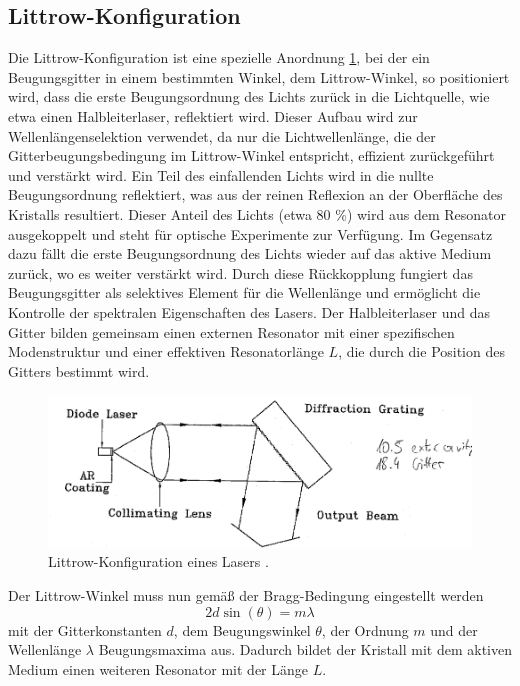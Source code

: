 \subsection{Littrow-Konfiguration}
Die Littrow-Konfiguration ist eine spezielle Anordnung \ref{fig:Littrow}, bei der ein Beugungsgitter in einem bestimmten Winkel, 
dem Littrow-Winkel, so positioniert wird, dass die erste Beugungsordnung des Lichts zurück in die Lichtquelle, wie etwa einen Halbleiterlaser, 
reflektiert wird. 
Dieser Aufbau wird zur Wellenlängenselektion verwendet, da nur die Lichtwellenlänge, die der Gitterbeugungsbedingung im Littrow-Winkel entspricht, 
effizient zurückgeführt und verstärkt wird.
Ein Teil des einfallenden Lichts wird in die nullte Beugungsordnung reflektiert, was aus der reinen Reflexion an der Oberfläche des Kristalls resultiert.  Dieser Anteil des Lichts (etwa 80 \%) wird aus dem Resonator ausgekoppelt 
und steht für optische Experimente zur Verfügung. Im Gegensatz dazu fällt die erste Beugungsordnung des Lichts wieder auf das aktive Medium zurück, 
wo es weiter verstärkt wird.
Durch diese Rückkopplung fungiert das Beugungsgitter als selektives Element für die Wellenlänge und ermöglicht die Kontrolle der spektralen Eigenschaften des Lasers. 
Der Halbleiterlaser und das Gitter bilden gemeinsam einen externen Resonator mit einer spezifischen Modenstruktur und einer effektiven Resonatorlänge $L$, die durch die Position des Gitters bestimmt wird.
\begin{figure}[H]
    \centering
    \includegraphics[scale=0.8]{pictures/Littrow.png}
    \caption{Littrow-Konfiguration eines Lasers \cite{teachspin}.}
    \label{fig:Littrow}
\end{figure}
\noindent Der Littrow-Winkel muss nun gemäß der Bragg-Bedingung eingestellt werden
\begin{equation}
    2d\sin(\theta)=m\lambda
\end{equation}
mit der Gitterkonstanten $d$, dem Beugungswinkel $\theta$, der Ordnung $m$ und der Wellenlänge $\lambda$ Beugungsmaxima aus. 
Dadurch bildet der Kristall mit dem aktiven Medium einen weiteren Resonator mit der Länge $L$. 
